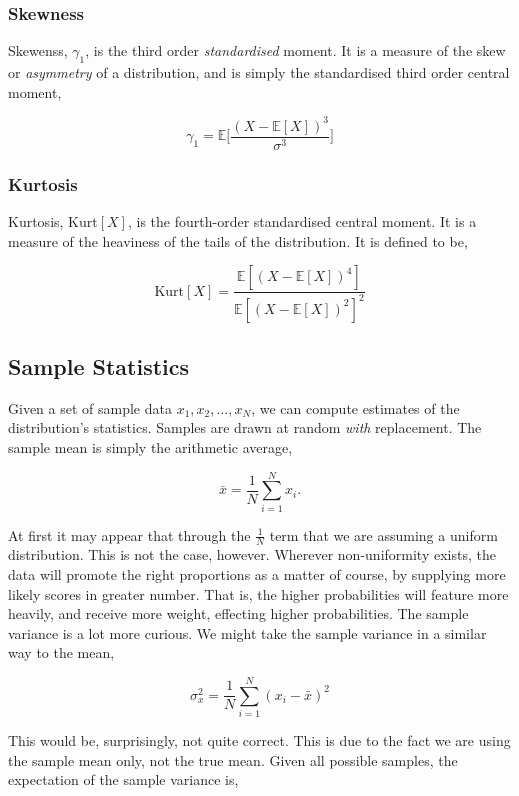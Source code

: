 \documentclass[11pt]{amsart}
\begin{document}
\subsubsection{Skewness}

Skewenss, $\gamma_1$, is the third order \emph{standardised} moment. It is a measure of the skew or \emph{asymmetry} of a distribution, and is simply the standardised third order central moment,

$$
\gamma_1 = \mathbb{E}\Bigg[\frac{(X - \mathbb{E}[X])^3}{\sigma^3}\Bigg]
$$

\subsubsection{Kurtosis}

Kurtosis, $\text{Kurt}[X]$, is the fourth-order standardised central moment. It is a measure of the heaviness of the tails of the distribution. It is defined to be,

$$
\text{Kurt}[X] = \frac{\mathbb{E}[(X - \mathbb{E}[X])^4]}{\mathbb{E}[(X - \mathbb{E}[X])^2]^2}
$$

\subsection{Sample Statistics}

Given a set of sample data $x_1, x_2, \dots, x_N$, we can compute estimates of the distribution's statistics. Samples are drawn at random \emph{with} replacement. The sample mean is simply the arithmetic average,

$$\bar{x} = \frac{1}{N}\sum_{i=1}^N x_i.$$

At first it may appear that through the $\frac{1}{N}$ term that we are assuming a uniform distribution. This is not the case, however. Wherever non-uniformity exists, the data will promote the right proportions as a matter of course, by supplying more likely scores in greater number. That is, the higher probabilities will feature more heavily, and receive more weight, effecting higher probabilities. The sample variance is a lot more curious. We might take the sample variance in a similar way to the mean,

$$\sigma_x^2 = \frac{1}{N}\sum_{i=1}^N (x_i - \bar{x})^2$$

This would be, surprisingly, not quite correct. This is due to the fact we are using the sample mean only, not the true mean. Given all possible samples, the expectation of the sample variance is,
\end{document}

